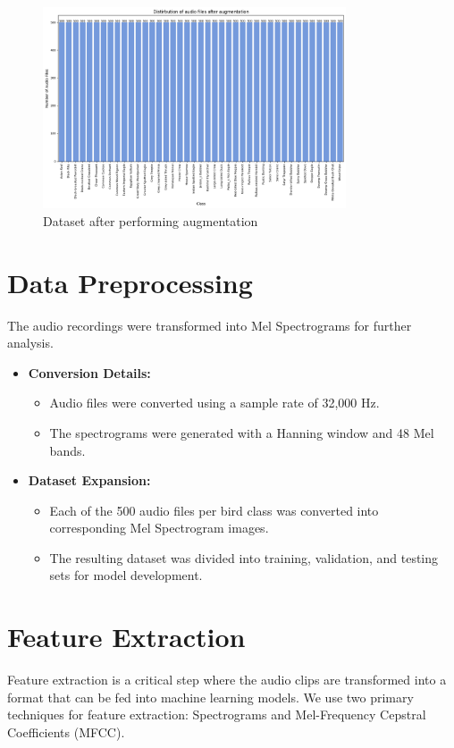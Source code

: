 \begin{figure}[h!]
    \centering
    \includegraphics[width=0.8\textwidth]{images/after_augmentation.png}
    \caption{Dataset after performing augmentation}
    \label{fig:visualization}
\end{figure}

\section{Data Preprocessing}
The audio recordings were transformed into Mel Spectrograms for further
analysis.

\begin{itemize}
    \item \textbf{Conversion Details:}
          \begin{itemize}
              \item Audio files were converted using a sample rate of 32,000 Hz.
              \item The spectrograms were generated with a Hanning window and 48 Mel bands.
          \end{itemize}

    \item \textbf{Dataset Expansion:}
          \begin{itemize}
              \item Each of the 500 audio files per bird class was converted into corresponding Mel
                    Spectrogram images.
              \item The resulting dataset was divided into training, validation, and testing sets
                    for model development.
          \end{itemize}
\end{itemize}

\section{Feature Extraction}
Feature extraction is a critical step where the audio clips are transformed
into a format that can be fed into machine learning models. We use two primary
techniques for feature extraction: Spectrograms and Mel-Frequency Cepstral
Coefficients (MFCC).

